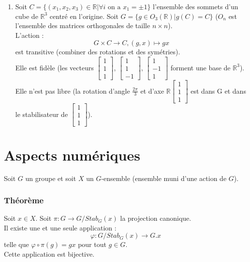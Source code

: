 \documentclass[a4paper, oneside]{report}
\newcommand{\x}{\times}
\newcommand{\R}{\mathbb{R}}
\newcommand{\theo}{\subsubsection{Théorème}}
\begin{document}
\begin{enumerate}
\item Soit $C=\{(x_1,x_2,x_3) \in \R | \forall i\text{ on a } x_1= \pm 1 \}$ l'ensemble des sommets d'un cube de $\R^3$ centré en l'origine. Soit $G = \{g \in O_3(\R) | g(C)=C \}$ ($O_n$ est l'ensemble des matrices orthogonales de taille $n\x n$).\\
L'action :
$$G\x C \rightarrow C, (g,x)\mapsto gx$$
est transitive (combiner des rotations et des symétries).\\
Elle est fidèle (les vecteurs $\left[\begin{array}{l}
1\\
1\\
1
\end{array}\right]$, $\left[\begin{array}{l}
1\\
1\\
-1
\end{array}\right]$, $\left[\begin{array}{l}
1\\
-1\\
1
\end{array}\right]$ forment une base de $\R^3$).\\
Elle n'est pas libre (la rotation d'angle $\frac{2\pi}{3}$ et d'axe $\R \left[\begin{array}{l}
1\\
1\\
1
\end{array}\right]$ est dans G et dans le stabilisateur de $\left[\begin{array}{l}
1\\
1\\
1
\end{array}\right]$).
\end{enumerate}

\section{Aspects numériques}

Soit $G$ un groupe et soit $X$ un $G$-ensemble (ensemble muni d'une action de $G$).

\theo
Soit $x\in X$. Soit $\pi : G \rightarrow G/Stab_G(x)$ la projection canonique.\\
Il existe une et une seule application :
$$\varphi : G/Stab_G(x) \rightarrow G.x$$
telle que $\varphi \circ \pi(g)=gx$ pour tout $g\in G$.\\
Cette application est bijective.
\end{document}
